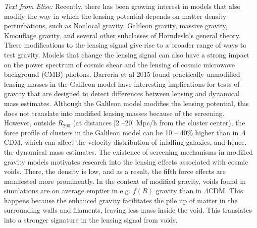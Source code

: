 {\it Text from Elise:} 
Recently, there has been growing interest in models that also modify the way in which the lensing potential depends on matter density perturbations, such as Nonlocal gravity, Galileon gravity, massive gravity, Kmouflage gravity, and several other subclasses of Horndeski's general theory.
These modifications to the lensing signal give rise to a broader range of ways to test gravity.
Models that change the lensing signal can also have a strong impact on the power spectrum of cosmic shear and the lensing of cosmic microwave background (CMB) photons.
Barreria et al 2015 found practically unmodified lensing masses in the Galileon model have interesting implications for tests of gravity that are designed to detect differences between lensing and dynamical mass estimates. Although the Galileon model modifies the lensing potential, this does not translate into modified lensing masses because of the screening. However, outside $R_{200}$ (at distances [2 --20] Mpc/h from the cluster center), the force profile of clusters in the Galileon model can be 10 -- 40\% higher than in $\Lambda$CDM, which can affect the velocity distribution of infalling galaxies, and hence, the dynamical mass estimates. 
The existence of screening mechanisms in modified gravity models motivates research into the lensing effects associated with cosmic voids. There, the density is low, and as a result, the fifth force effects are manifested more prominently. In the context of modified gravity, voids found in simulations are on average emptier in e.g. $f(R)$ gravity than in $\Lambda$CDM. This happens because the enhanced gravity facilitates the pile up of matter in the surrounding walls and filaments, leaving less mass inside the void. This translates into a stronger signature in the lensing signal from voids.

